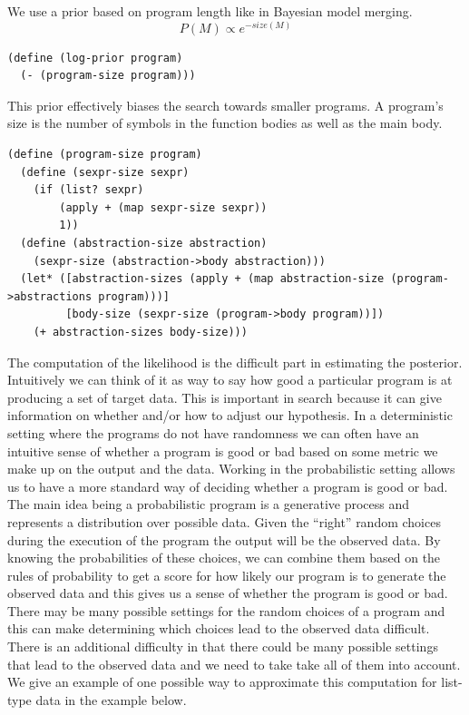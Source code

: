 \documentclass[a4paper,10pt]{article}
\begin{document}
We use a prior based on program length like in Bayesian model merging.  
\begin{equation}P(M)\propto e^{-size(M)}\end{equation}
\begin{lstlisting}[frame=trBL]
(define (log-prior program)
  (- (program-size program)))
\end{lstlisting}
This prior effectively biases the search towards smaller programs.  A program's size is the number of symbols in the function bodies as well as the main body.
\begin{lstlisting}[frame=trBL]
(define (program-size program)
  (define (sexpr-size sexpr)
    (if (list? sexpr)
        (apply + (map sexpr-size sexpr))
        1))
  (define (abstraction-size abstraction)
    (sexpr-size (abstraction->body abstraction)))
  (let* ([abstraction-sizes (apply + (map abstraction-size (program->abstractions program)))]
         [body-size (sexpr-size (program->body program))])
    (+ abstraction-sizes body-size)))
\end{lstlisting}
The computation of the likelihood is the difficult part in estimating the posterior.  Intuitively we can think of it as way to say how good a particular program is at producing a set of target data.  This is important in search because it can give information on whether and/or how to adjust our hypothesis.  In a deterministic setting where the programs do not have randomness we can often have an intuitive sense of whether a program is good or bad based on some metric we make up on the output and the data.  Working in the probabilistic setting allows us to have a more standard way of deciding whether a program is good or bad.  The main idea being a probabilistic program is a generative process and represents a distribution over possible data.  Given the ``right'' random choices during the execution of the program the output will be the observed data.  By knowing the probabilities of these choices, we can combine them based on the rules of probability to get a score for how likely our program is to generate the observed data and this gives us a sense of whether the program is good or bad.  There may be many possible settings for the random choices of a program and this can make determining which choices lead to the observed data difficult.  There is an additional difficulty in that there could be many possible settings that lead to the observed data and we need to take take all of them into account.  We give an example of one possible way to approximate this computation for list-type data in the example below.
\end{document}
